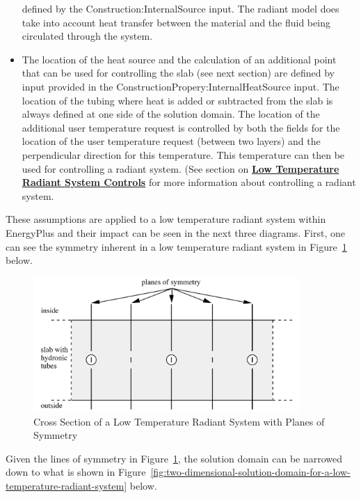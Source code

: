 \begin{itemize}
defined by the Construction:InternalSource input.  The radiant model does take
into account heat transfer between the material and the fluid being circulated
through the system.
\item
The location of the heat source and the calculation of an additional point that
can be used for controlling the slab (see next section) are defined by input
provided in the ConstructionPropery:InternalHeatSource input.  The location of
the tubing where heat is added or subtracted from the slab is always defined at
one side of the solution domain.  The location of the additional user
temperature request is controlled by both the fields for the location of the
user temperature request (between two layers) and the perpendicular direction
for this temperature.  This temperature can then be used for controlling a
radiant system.  (See section on
\textbf{\hyperref[low-temperature-radiant-system-controls]{Low Temperature Radiant System Controls}}
for more information about controlling a radiant system.
\end{itemize}

These assumptions are applied to a low temperature radiant system within EnergyPlus and their impact can be seen in the next three diagrams.  First, one can see the symmetry inherent in a low temperature radiant system in Figure~\ref{fig:cross-section-of-a-low-temperature-radiant-system-with-planes-of-symmetry} below.

\begin{figure}[hbtp] %
\centering
\includegraphics[width=0.9\textwidth, height=0.9\textheight, keepaspectratio=true]{media/RadSys2DCrossSection.png}
\caption{Cross Section of a Low Temperature Radiant System with Planes of Symmetry \protect \label{fig:cross-section-of-a-low-temperature-radiant-system-with-planes-of-symmetry}}
\end{figure}

Given the lines of symmetry in Figure~\ref{fig:cross-section-of-a-low-temperature-radiant-system-with-planes-of-symmetry}, the solution domain can be narrowed down to what is shown in Figure~\ref{fig:two-dimensional-solution-domain-for-a-low-temperature-radiant-system} below.

